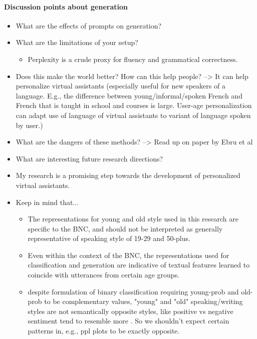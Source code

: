 \paragraph{Discussion points about generation}
\begin{itemize}
    \item What are the effects of prompts on generation? 
    \item What are the limitations of your setup?
        \begin{itemize}
            \item Perplexity is a crude proxy for fluency and grammatical correctness.
        \end{itemize}
    \item Does this make the world better? How can this help people? --> It can help personalize virtual assistants (especially useful for new speakers of a language. E.g., the difference between young/informal/spoken French and French that is taught in school and courses is large. User-age personalization can adapt use of language of virtual assistants to variant of language spoken by user.)
    \item What are the dangers of these methods? --> Read up on paper by Ebru et al
    \item What are interesting future research directions?
    \item My research is a promising step towards the development of personalized virtual assistants.
    \item Keep in mind that...
        \begin{itemize}
            \item  The representations for young and old style used in this research are specific to the BNC, and should not be interpreted as generally representative of speaking style of 19-29 and 50-plus.
            \item Even within the context of the BNC, the representations used for classification and generation are indicative of textual features learned to coincide with utterances from certain age groups.
            \item despite formulation of binary classification requiring young-prob and old-prob to be complementary values, "young" and "old" speaking/writing styles are not semantically opposite styles, like positive vs negative sentiment tend to resemble more . So we shouldn't expect certain patterns in, e.g., ppl plots to be exactly opposite.

\end{itemize}
\end{itemize}
